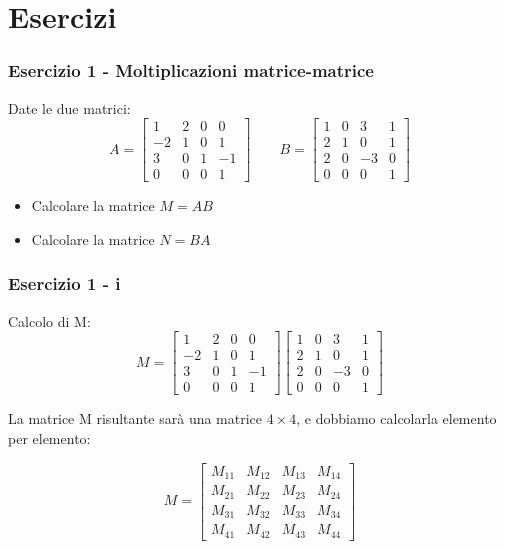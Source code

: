 \documentclass{beamer}
\begin{document}
\section{Esercizi}
%
\begin{frame}
\frametitle{Esercizio 1 - Moltiplicazioni matrice-matrice}
Date le due matrici:
\begin{displaymath}
    A =
\begin{bmatrix}
   1 &  2 &  0 &  0 \\
  -2 &  1 &  0 &  1 \\
   3 &  0 &  1 & -1 \\
   0 &  0 &  0 &  1
\end{bmatrix}
\qquad
B = 
\begin{bmatrix}
   1 &  0 &  3 &  1 \\
   2 &  1 &  0 &  1 \\
   2 &  0 & -3 &  0 \\
   0 &  0 &  0 &  1 
\end{bmatrix}
\end{displaymath}
\begin{itemize}
\item Calcolare la matrice $M = A B$
\item Calcolare la matrice $N = B A$
\end{itemize}
\end{frame}
%
\begin{frame}
\frametitle{Esercizio 1 - i}
Calcolo di M:
\begin{displaymath}
    M =
\begin{bmatrix}
   1 &  2 &  0 &  0 \\
  -2 &  1 &  0 &  1 \\
   3 &  0 &  1 & -1 \\
   0 &  0 &  0 &  1
\end{bmatrix}
\begin{bmatrix}
   1 &  0 &  3 &  1 \\
   2 &  1 &  0 &  1 \\
   2 &  0 & -3 &  0 \\
   0 &  0 &  0 &  1 
\end{bmatrix}
\end{displaymath}

La matrice M risultante sar\`a una matrice $4\times4$, e dobbiamo calcolarla elemento per elemento:

\begin{displaymath}
    M =
\begin{bmatrix}
    M_{11} & M_{12} & M_{13} & M_{14} \\
    M_{21} & M_{22} & M_{23} & M_{24} \\
    M_{31} & M_{32} & M_{33} & M_{34} \\
    M_{41} & M_{42} & M_{43} & M_{44}
\end{bmatrix}
\end{displaymath}

\end{frame}
\end{document}
